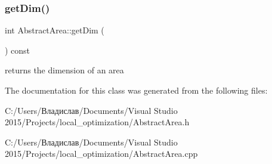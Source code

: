 \subsubsection{get\+Dim()}
{\footnotesize\ttfamily int Abstract\+Area\+::get\+Dim (\begin{DoxyParamCaption}{ }\end{DoxyParamCaption}) const}

returns the dimension of an area 

The documentation for this class was generated from the following files\+:\begin{DoxyCompactItemize}
\item 
C\+:/\+Users/Владислав/\+Documents/\+Visual Studio 2015/\+Projects/local\+\_\+optimization/Abstract\+Area.\+h\item 
C\+:/\+Users/Владислав/\+Documents/\+Visual Studio 2015/\+Projects/local\+\_\+optimization/Abstract\+Area.\+cpp\end{DoxyCompactItemize}
